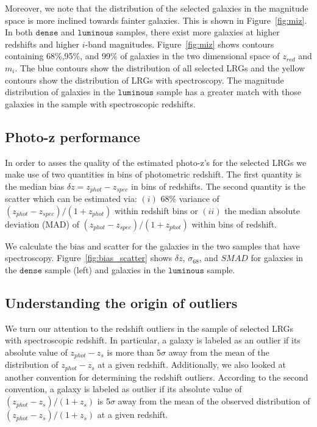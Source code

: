 \documentclass[fleqn,usenatbib]{mnras}
\begin{document}
Moreover, we note that the distribution of the selected galaxies in the magnitude space is more inclined towards fainter galaxies. This is shown in Figure~\ref{fig:miz}. In both $\mathtt{dense}$ and $\mathtt{luminous}$ samples, there exist more galaxies at higher redshifts and higher $i$-band magnitudes. Figure~\ref{fig:miz} shows contours containing 68\%,95\%, and 99\% of galaxies in the two dimensional space of $z_{red}$ and $m_i$. The blue contours show the distribution of all selected LRGs and the yellow contours show the distribution of LRGs with spectroscopy. The magnitude distribution of galaxies in the $\mathtt{luminous}$ sample has a greater match with those galaxies in the sample with spectroscopic redshifts.  

\subsection{Photo-z performance}\label{sec:performance}

In order to asses the quality of the estimated photo-z's 
for the selected LRGs we make use of two quantities in bins of photometric redshift. The first quantity is the median bias $\delta z = z_{phot} - z_{spec}$ in bins of redshifts. The second quantity is the scatter which can be estimated via: $(i)$ 68\% variance of $(z_{phot} - z_{spec})/(1+z_{phot})$ within redshift bins or $(ii)$ the median absolute deviation (MAD) of $(z_{phot} - z_{spec})/(1+z_{phot})$ within bins of redshift. 

We calculate the bias and scatter for the galaxies in the two samples that have spectroscopy. Figure~\ref{fig:bias_scatter} shows $\delta z$, $\sigma_{68}$, and $SMAD$ for galaxies in the $\mathtt{dense}$ sample (left) and galaxies in the $\mathtt{luminous}$ sample.

\subsection{Understanding the origin of outliers}

We turn our attention to the redshift outliers in the sample of selected LRGs with spectroscopic redshift. In particular, a galaxy is labeled as an outlier if its  absolute value of $z_{phot} - z_{s}$ is more than 5$\sigma$ away from the mean of the distribution of $z_{phot}-z_{s}$ at a given redshift. Additionally, we also looked at another convention for determining the redshift outliers. According to the second convention, a galaxy is labeled as outlier if its absolute value of $(z_{phot}-z_{s})/(1+z_{s})$ is 5$\sigma$ away from the mean of the observed distribution of $(z_{phot}-z_{s})/(1+z_{s})$ at a given redshift. 
\end{document}
